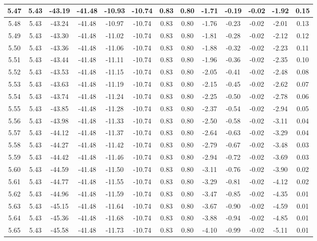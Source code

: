 \begin{table}[htbp]
\begin{adjustbox}{angle=90}
\begin{tabular}{|c|c|c|c|c|c|c|c|c|c|c|c|c|}
 5.47 & 5.43 & -43.19 & -41.48 & -10.93 & -10.74 & 0.83 & 0.80 & -1.71 & -0.19 & -0.02 & -1.92 & 0.15\\ \hline
 5.48 & 5.43 & -43.24 & -41.48 & -10.97 & -10.74 & 0.83 & 0.80 & -1.76 & -0.23 & -0.02 & -2.01 & 0.13\\ \hline
 5.49 & 5.43 & -43.30 & -41.48 & -11.02 & -10.74 & 0.83 & 0.80 & -1.81 & -0.28 & -0.02 & -2.12 & 0.12\\ \hline
 5.50 & 5.43 & -43.36 & -41.48 & -11.06 & -10.74 & 0.83 & 0.80 & -1.88 & -0.32 & -0.02 & -2.23 & 0.11\\ \hline
 5.51 & 5.43 & -43.44 & -41.48 & -11.11 & -10.74 & 0.83 & 0.80 & -1.96 & -0.36 & -0.02 & -2.35 & 0.10\\ \hline
 5.52 & 5.43 & -43.53 & -41.48 & -11.15 & -10.74 & 0.83 & 0.80 & -2.05 & -0.41 & -0.02 & -2.48 & 0.08\\ \hline
 5.53 & 5.43 & -43.63 & -41.48 & -11.19 & -10.74 & 0.83 & 0.80 & -2.15 & -0.45 & -0.02 & -2.62 & 0.07\\ \hline
 5.54 & 5.43 & -43.74 & -41.48 & -11.24 & -10.74 & 0.83 & 0.80 & -2.25 & -0.50 & -0.02 & -2.78 & 0.06\\ \hline
 5.55 & 5.43 & -43.85 & -41.48 & -11.28 & -10.74 & 0.83 & 0.80 & -2.37 & -0.54 & -0.02 & -2.94 & 0.05\\ \hline
 5.56 & 5.43 & -43.98 & -41.48 & -11.33 & -10.74 & 0.83 & 0.80 & -2.50 & -0.58 & -0.02 & -3.11 & 0.04\\ \hline
 5.57 & 5.43 & -44.12 & -41.48 & -11.37 & -10.74 & 0.83 & 0.80 & -2.64 & -0.63 & -0.02 & -3.29 & 0.04\\ \hline
 5.58 & 5.43 & -44.27 & -41.48 & -11.42 & -10.74 & 0.83 & 0.80 & -2.79 & -0.67 & -0.02 & -3.48 & 0.03\\ \hline
 5.59 & 5.43 & -44.42 & -41.48 & -11.46 & -10.74 & 0.83 & 0.80 & -2.94 & -0.72 & -0.02 & -3.69 & 0.03\\ \hline
 5.60 & 5.43 & -44.59 & -41.48 & -11.50 & -10.74 & 0.83 & 0.80 & -3.11 & -0.76 & -0.02 & -3.90 & 0.02\\ \hline
 5.61 & 5.43 & -44.77 & -41.48 & -11.55 & -10.74 & 0.83 & 0.80 & -3.29 & -0.81 & -0.02 & -4.12 & 0.02\\ \hline
 5.62 & 5.43 & -44.96 & -41.48 & -11.59 & -10.74 & 0.83 & 0.80 & -3.47 & -0.85 & -0.02 & -4.35 & 0.01\\ \hline
 5.63 & 5.43 & -45.15 & -41.48 & -11.64 & -10.74 & 0.83 & 0.80 & -3.67 & -0.90 & -0.02 & -4.59 & 0.01\\ \hline
 5.64 & 5.43 & -45.36 & -41.48 & -11.68 & -10.74 & 0.83 & 0.80 & -3.88 & -0.94 & -0.02 & -4.85 & 0.01\\ \hline
 5.65 & 5.43 & -45.58 & -41.48 & -11.73 & -10.74 & 0.83 & 0.80 & -4.10 & -0.99 & -0.02 & -5.11 & 0.01\\ \hline
            \end{tabular}
        \end{adjustbox}
        \caption{}
        \label{}
    \end{table}
    